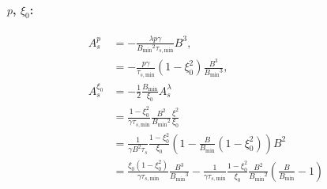 \documentclass[11pt,a4paper]{article}
\newcommand{\sub}[1]{\ensuremath{_{\text{#1}}}}
\begin{document}
\paragraph{$p$, $\xi_0$:}
\begin{align}
A_s^p%
&= -\frac{\lambda p\gamma}{B\sub{min}^2\tau_{s,\text{min}}}B^3, \nonumber \\
&= -\frac{p\gamma}{\tau_{s,\text{min}}} (1-\xi_0^2)\frac{B^3}{B\sub{min}^3}, \nonumber \\
A_s^{\xi_0} &= -\frac{1}{2}\frac{B\sub{min}}{\xi_0}A_s^{\lambda} \nonumber \\
&= \frac{1-\xi_0^2}{\gamma\tau_{s,\text{min}}} \frac{B^2}{B\sub{min}^2}\frac{\xi^2}{\xi_0} \nonumber \\
&= \frac{1}{\gamma B^2 \tau_s} \frac{1-\xi_0^2}{\xi_0} \left(1-\frac{B}{B\sub{min}}(1-\xi_0^2)\right) B^2\nonumber \\
&= \frac{ \xi_0(1-\xi_0^2)}{\gamma \tau_{s,\text{min}}} \frac{B^3}{B\sub{min}^3} -  \frac{1}{\gamma \tau_{s,\text{min}}}\frac{1-\xi_0^2}{\xi_0}\frac{B^2}{B\sub{min}^2}\left(\frac{B}{B\sub{min}}-1\right) 
\end{align}
\end{document}
